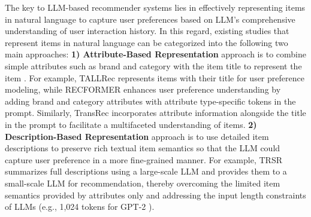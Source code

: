 \documentclass[sigconf]{acmart}
\begin{document}
The key to LLM-based recommender systems lies in effectively representing items in natural language to capture user preferences based on LLM's comprehensive understanding of user interaction history. In this regard, existing studies that represent items in natural language can be categorized into the following two main approaches:
\textbf{1) Attribute-Based Representation} approach is to combine simple attributes such as brand and category with the item title to represent the item \cite{bao2023tallrec,li2023text,tan2024idgenrec,lin2024bridging}. For example, TALLRec \cite{bao2023tallrec} represents items with their title for user preference modeling, while RECFORMER \cite{li2023text} enhances user preference understanding by adding brand and category attributes with attribute type-specific tokens in the prompt. Similarly, TransRec \cite{lin2024bridging} incorporates attribute information alongside the title in the prompt to facilitate a multifaceted understanding of items.
\textbf{2) Description-Based Representation} approach is to use detailed item descriptions to preserve rich textual item semantics so that the LLM could capture user preference in a more fine-grained manner. For example, TRSR \cite{zheng2024harnessing} summarizes full descriptions using a large-scale LLM and provides them to a small-scale  LLM for recommendation, thereby overcoming the limited item semantics provided by attributes only and addressing the input length constraints of LLMs (e.g., 1,024 tokens for GPT-2 \cite{radford2019language}).
\end{document}
